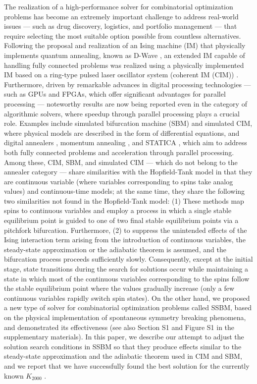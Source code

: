 \documentclass[%
 reprint,
 amsmath,amssymb,
 aps,
]{revtex4-2}
\begin{document}
The realization of a high-performance solver for combinatorial optimization problems has become an extremely important challenge to address real-world issues — such as drug discovery, logistics, and portfolio management — that require selecting the most suitable option possible from countless alternatives.
Following the proposal and realization of an Ising machine (IM) that physically implements quantum annealing, known as D-Wave \cite{Johnson}, an extended IM capable of handling fully connected problems was realized using a physically implemented IM based on a ring-type pulsed laser oscillator system (coherent IM (CIM)) \cite{Yamamoto}.
Furthermore, driven by remarkable advances in digital processing technologies — such as GPUs and FPGAs, which offer significant advantages for parallel processing — noteworthy results are now being reported even in the category of algorithmic solvers, where speedup through parallel processing plays a crucial role.
Examples include simulated bifurcation machine (SBM)\cite{Goto} and simulated CIM, where physical models are described in the form of differential equations, and digital annealers \cite{Aramon}, momentum annealing \cite{Okuyama}, and STATICA \cite{KYamamoto}, which aim to address both fully connected problems and acceleration through parallel processing.
Among these, CIM, SBM, and simulated CIM — which do not belong to the annealer category — share similarities with the Hopfield-Tank model\cite{HopfieldT} in that they are continuous variable (where variables corresponding to spins take analog values) and continuous-time models; at the same time, they share the following two similarities not found in the Hopfield-Tank model: (1) These methods map spins to continuous variables and employ a process in which a single stable equilibrium point is guided to one of two final stable equilibrium points via a pitchfork bifurcation. Furthermore, (2) to suppress the unintended effects of the Ising interaction term arising from the introduction of continuous variables, the steady-state approximation or the adiabatic theorem is assumed, and the bifurcation process proceeds sufficiently slowly\cite{Yamamoto, Goto}.
Consequently, except at the initial stage, state transitions during the search for solutions occur while maintaining a state in which most of the continuous variables corresponding to the spins follow the stable equilibrium point where the values gradually increase (only a few continuous variables rapidly switch spin states).
On the other hand, we proposed a new type of solver for combinatorial optimization problems called SSBM, based on the physical implementation of spontaneous symmetry breaking phenomena, and demonstrated its effectiveness \cite{Toshiy01,Toshiy02} (see also Section S1 and Figure S1 in the supplementary materials).
In this paper, we describe our attempt to adjust the solution search conditions in SSBM so that they produce effects similar to the steady-state approximation and the adiabatic theorem used in CIM and SBM, and we report that we have successfully found the best solution \cite{GOTO-02} for the currently known $K_{2000}$ \cite{Yamamoto-2}.
\end{document}
